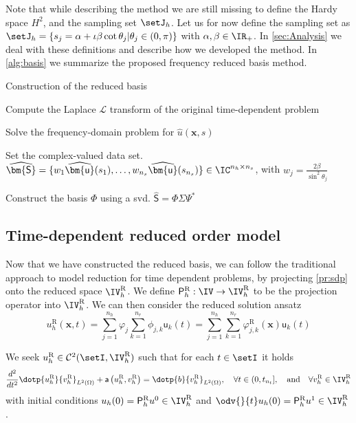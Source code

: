 Note that while describing the method we are still missing to define the Hardy space $H^2$, and the sampling set $\setJ_h$. Let us for now define the sampling set as $\setJ_h = \{ s_j =\alpha + \iota \beta \cot{\theta_j} | \theta_j \in (0,\pi) \}$ with $\alpha, \beta \in \IR_+$. In \cref{sec:Analysis} we deal with these definitions and describe how we developed the method. In \cref{alg:basis} we summarize the proposed frequency reduced basis method.
\begin{algorithm}
\caption{Construction of the reduced basis} \label{alg:basis}
    Compute the Laplace $\mathcal{L}$ transform of the original time-dependent problem
    
        {Solve the frequency-domain problem for $\widehat{u}(\bm{x},s)$}
        
    Set the complex-valued data set. $\widehat{\bm{\mathsf{S}}} = \{ w_1\widehat{\bm{\mathsf{u}}}(s_1), \dots, w_{n_s}\widehat{\bm{\mathsf{u}}}(s_{n_s}) \} \in \IC^{n_h \times n_s}$, with $w_j = \frac{2\beta}{\sin^2 \theta_j}$ 

    Construct the basis $\Phi$ using a \gls{svd}. $\widehat{\bm{\mathsf{S}}} = \Phi \Sigma \Psi^*$
\end{algorithm}

\subsection{Time-dependent reduced order model} \label{ssec:rom}

Now that we have constructed the reduced basis, we can follow the traditional approach to model reduction for time dependent problems, by projecting \cref{pr:sdp} onto the reduced space $\IV_h^{\textrm{R}}$. We define $\mathsf{P}_h^{\textrm{R}}: \IV \rightarrow \IV_h^{\textrm{R}}$ to be the projection operator into $\IV_h^{\textrm{R}}$. We can then consider the reduced solution ansatz
\begin{equation}
    u_h^{\textrm{R}}(\bm{x},t) = \sum_{j=1}^{n_h} \varphi_{j} \sum_{k=1}^{n_r} \phi_{j,k} \mathsf{u}_k(t) = \sum_{j=1}^{n_h}  \sum_{k=1}^{n_r} \varphi_{j,k}^{\textrm{R}} (\bm{x}) \mathsf{u}_k(t) 
\end{equation}

\begin{problem} \label{pr:sdpr}
We seek $u^{\textrm{R}}_{h} \in \mathcal{C}^2(\setI, \IV_h^{\textrm{R}})$ such that for each $t \in \setI$ it holds
\begin{align}\label{eq:semi_discrete_rom}
	\frac{d^2}{dt^2} \dotp{u_h^{\textrm{R}}}{v_h^{\textrm{R}}}_{L^2(\Omega)} + \mathsf{a} \left(u_h^{\textrm{R}},v_h^{\textrm{R}} \right) = \dotp{b}{v_h^{\textrm{R}} }_{L^2(\Omega)}, \quad \forall t \in (0,t_{n_t}], \quad \text{and} \quad \forall v_h^{\textrm{R}} \in \IV_{h}^{\textrm{R}}
\end{align}
with initial conditions $u_h(0) = \mathsf{P}_{h}^{\textrm{R}} u^0\in \IV_h^{\textrm{R}}$ and $ \odv{}{t} u_h(0) = \mathsf{P}_{h}^{\textrm{R}} u^1\in \IV_h^{\textrm{R}}$.
\end{problem}

